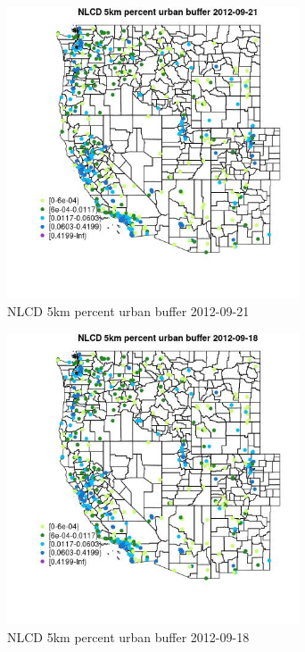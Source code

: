 \begin{figure} 
\centering  
\includegraphics[width=0.77\textwidth]{Code_Outputs/Report_ML_input_PM25_Step4_part_e_de_duplicated_aves_compiled_2019-05-14wNAs_MapObsNLCD_5km_percent_urban_buffer2012-09-21.jpg} 
\caption{\label{fig:Report_ML_input_PM25_Step4_part_e_de_duplicated_aves_compiled_2019-05-14wNAsMapObsNLCD_5km_percent_urban_buffer2012-09-21}NLCD 5km percent urban buffer 2012-09-21} 
\end{figure} 
 

\begin{figure} 
\centering  
\includegraphics[width=0.77\textwidth]{Code_Outputs/Report_ML_input_PM25_Step4_part_e_de_duplicated_aves_compiled_2019-05-14wNAs_MapObsNLCD_5km_percent_urban_buffer2012-09-18.jpg} 
\caption{\label{fig:Report_ML_input_PM25_Step4_part_e_de_duplicated_aves_compiled_2019-05-14wNAsMapObsNLCD_5km_percent_urban_buffer2012-09-18}NLCD 5km percent urban buffer 2012-09-18} 
\end{figure} 
 

